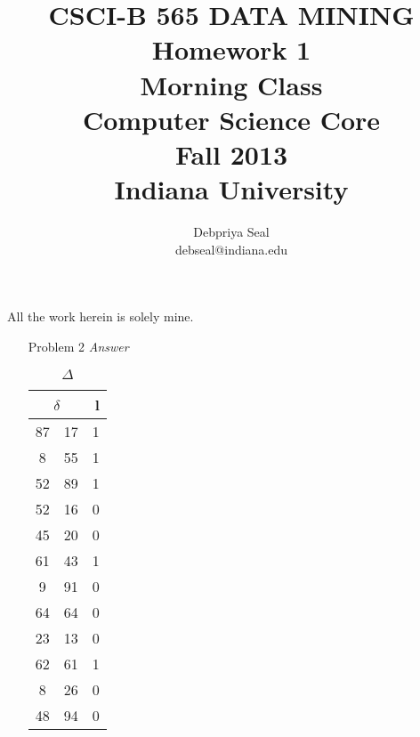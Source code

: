 \documentclass{article}
\begin{document}
\title{ CSCI-B 565 DATA MINING \\
Homework 1 \\
Morning Class\\
Computer Science Core\\Fall 2013\\Indiana University}
\author{ Debpriya Seal\\ debseal@indiana.edu}
\maketitle
All the work herein is solely mine.

\begin{enumerate}
	\item[Problem] 2 
		\emph{Answer}
		\begin{table}[h]
			\caption{$\Delta$} 
			\centering
			\begin{tabular}{cc r}
				\hline
				\multicolumn{2}{c}{$\delta$} & l \\
				\hline
								{87} & {17} & {1} \\
								{8} & {55} & {1} \\
								{52} & {89} & {1} \\
								{52} & {16} & {0} \\
								{45} & {20} & {0} \\
								{61} & {43} & {1} \\
								{9} & {91} & {0} \\
								{64} & {64} & {0} \\
								{23} & {13} & {0} \\
								{62} & {61} & {1} \\
								{8} & {26} & {0} \\
								{48} & {94} & {0} \\
							\end{tabular}	
		\end{table}	
		

\end{enumerate}
\end{document}
